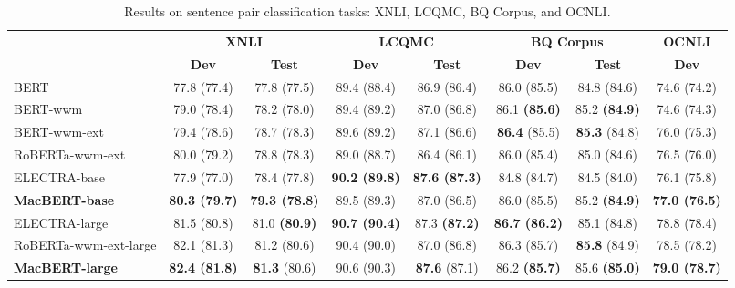 \documentclass[journal]{IEEEtran}
\begin{document}
\begin{CJK*}{UTF8}{gbsn}
\begin{table*}[htbp]
\caption{\label{result-spm} Results on sentence pair classification tasks: XNLI, LCQMC, BQ Corpus, and OCNLI. }
\begin{center}
\begin{tabular}{l cc | cc | cc | c}
\toprule
\bf & \multicolumn{2}{c}{\centering \bf XNLI} & \multicolumn{2}{c}{\centering \bf LCQMC} & \multicolumn{2}{c}{\centering \bf BQ Corpus} & \bf OCNLI \\
 & \bf Dev & \bf Test  & \bf Dev & \bf Test & \bf Dev & \bf Test & \bf Dev  \\
\midrule
BERT     		& 77.8 \tiny(77.4) & 77.8 \tiny(77.5) & 89.4 \tiny(88.4) & 86.9 \tiny(86.4) 	& 86.0 \tiny(85.5) 	& 84.8 \tiny(84.6) & 74.6 \tiny(74.2)  \\
BERT-wwm     	& 79.0 \tiny(78.4) & 78.2 \tiny(78.0) & 89.4 \tiny(89.2) & 87.0 \tiny(86.8)  & 86.1 \bf\tiny(85.6) 	& 85.2 \bf\tiny(84.9) & 74.6 \tiny(74.3) \\
BERT-wwm-ext	 & 79.4 \tiny(78.6) & 78.7 \tiny(78.3)  & 89.6 \tiny(89.2) & 87.1 \tiny(86.6) & {\bf 86.4} \tiny(85.5)  & {\bf 85.3} \tiny(84.8) & 76.0 \tiny(75.3)  \\
RoBERTa-wwm-ext & 80.0 \tiny(79.2) & 78.8 \tiny(78.3)  & 89.0 \tiny(88.7) & 86.4 \tiny(86.1) & 86.0 \tiny(85.4) & 85.0 \tiny(84.6) & 76.5 \tiny(76.0)   \\
ELECTRA-base 	& 77.9 \tiny(77.0) & 78.4 \tiny(77.8) & \bf 90.2 \tiny(89.8) & \bf 87.6 \tiny(87.3) & 84.8 \tiny(84.7) & 84.5 \tiny(84.0) & 76.1 \tiny(75.8) \\  
\bf MacBERT-base & \bf 80.3 \tiny(79.7) & \bf 79.3 \tiny(78.8) & 89.5 \tiny(89.3) & 87.0 \tiny(86.5) & 86.0 \tiny(85.5) & 85.2 \bf\tiny(84.9) & \bf 77.0 \tiny(76.5) \\
\midrule
ELECTRA-large 	& 81.5 \tiny(80.8) & 81.0 \bf\tiny(80.9) & \bf 90.7 \tiny(90.4) & 87.3 \bf\tiny(87.2) & \bf 86.7 \tiny(86.2) & 85.1 \tiny(84.8) & 78.8 \tiny(78.4)  \\
RoBERTa-wwm-ext-large & 82.1 \tiny(81.3) & 81.2 \tiny(80.6)  & 90.4 \tiny(90.0) & 87.0 \tiny(86.8) & 86.3 \tiny(85.7) & {\bf 85.8} \tiny(84.9) & 78.5 \tiny(78.2)  \\
\bf MacBERT-large & \bf 82.4 \tiny(81.8) & {\bf 81.3} \tiny(80.6) & 90.6 \tiny(90.3) & {\bf 87.6} \tiny(87.1) & 86.2 \bf \tiny(85.7) & 85.6 \bf \tiny(85.0) & \bf 79.0 \tiny(78.7)  \\
\bottomrule
\end{tabular}
\end{center}
\end{table*}




\end{CJK*}
\end{document}
